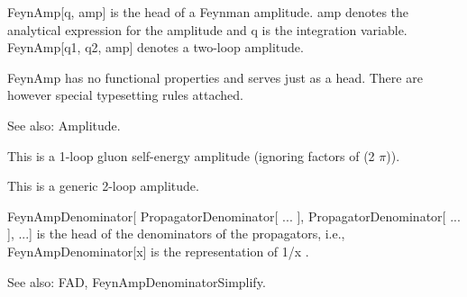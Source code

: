 FeynAmp[q, amp] is the head of a Feynman amplitude. amp denotes the analytical expression for the amplitude and q is the integration
  variable. FeynAmp[q1, q2, amp] denotes a two-loop amplitude.

FeynAmp has no functional properties and serves just as a head. There are however special typesetting rules attached.

See also:  Amplitude.


This is a 1-loop gluon self-energy amplitude (ignoring factors of (2 \(\pi \))).



This is a generic 2-loop amplitude.





FeynAmpDenominator[ PropagatorDenominator[ ... ], PropagatorDenominator[ ... ], ...] is the head of the denominators of the propagators,
  i.e., FeynAmpDenominator[x] is the representation of 1/x .

See also:  FAD, FeynAmpDenominatorSimplify.



